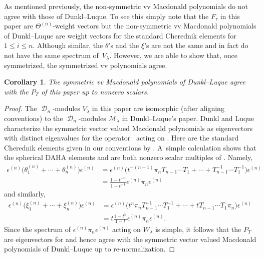 \documentclass[10pt,a4paper]{amsart}
\numberwithin{equation}{section}
\newtheorem{Corollary}[Theorem]{Corollary}
\theoremstyle{definition}
\DeclareMathOperator{\sD}{\mathscr{D}}
\begin{document}
As mentioned previously, the non-symmetric vv Macdonald polynomials do not agree with those of Dunkl--Luque. To see this simply note that the $F_{\tau}$ in this paper are $\Theta^{(n)}$-weight vectors but the non-symmetric vv Macdonald polynomials of Dunkl--Luque are weight vectors for the standard Cherednik elements  for $1\leq i\leq n$. Although similar, the $\theta$'s and the $\xi$'s are not the same and in fact do not have the same spectrum of~$V_{\lambda}$. However, we are able to show that, once symmetrized, the symmetrized vv polynomials agree.

\begin{Corollary}\label{Corollary recovering sym vv Macd}
 The symmetric vv Macdonald polynomials of Dunkl--Luque {\rm\cite[\emph{Theorem} 5.27]{DL_2011}} agree with the $P_T$ of this paper up to nonzero scalars.
\end{Corollary}

\begin{proof}
 The $\sD_n$-modules $V_{\lambda}$ in this paper are isomorphic (after aligning conventions) to the $\sD_n$-modules $\mathcal{M}_{\lambda}$ in Dunkl--Luque's paper. Dunkl and Luque characterize the symmetric vector valued Macdonald polynomials as eigenvectors with distinct eigenvalues for the operator~ acting on . Here  are the standard Cherednik elements given in our conventions by . A~simple calculation shows that the spherical DAHA elements  and  are both nonzero scalar multiples of . Namely,
 \begin{align*}
 \epsilon^{(n)}\bigl(\theta^{(n)}_1+\cdots + \theta^{(n)}_n\bigr)\epsilon^{(n)} &= \epsilon^{(n)}\bigl(t^{-(n-1)}\pi_nT_{n-1}\cdots T_1+\cdots + T_{n-1}^{-1}\cdots T_{1}^{-1}\bigr)\epsilon^{(n)}\\
 &= \frac{1-t^{-n}}{1-t^{-1}}\epsilon^{(n)} \pi_n \epsilon^{(n)}
 \end{align*}
 and similarly,
 \begin{align*}
 \epsilon^{(n)}\bigl(\xi^{(n)}_1+\cdots + \xi^{(n)}_n\bigr)\epsilon^{(n)} &= \epsilon^{(n)}\bigl(t^n \pi_n T_{n-1}^{-1}\cdots T_1^{-1}+\cdots +tT_{n-1}\cdots T_1\pi_n\bigr)\epsilon^{(n)}\\
 & = t\frac{1-t^n}{1-t}\epsilon^{(n)}\pi_n\epsilon^{(n)}.
 \end{align*}
 Since the spectrum of $\epsilon^{(n)}\pi_n\epsilon^{(n)}$ acting on $W_{\lambda}$ is simple, it follows that the $P_T$ are eigenvectors for  and hence agree with the symmetric vector valued Macdonald polynomials of Dunkl--Luque up to re-normalization.
\end{proof}
\end{document}
